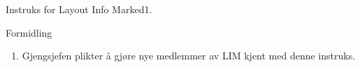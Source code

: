 \begin{instruks}{Instruks for Layout Info Marked}{1. }{ }
    \begin{instruksledd}{Formidling}
        \begin{enumerate}
            \item Gjengsjefen plikter å gjøre nye medlemmer av LIM kjent med denne instruks.
        \end{enumerate}
    \end{instruksledd}


\end{instruks}
